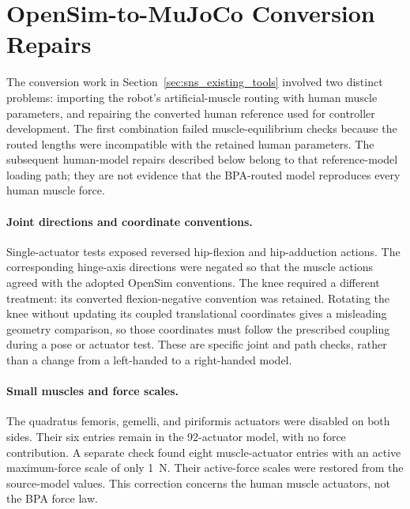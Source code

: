 \section{OpenSim-to-MuJoCo Conversion Repairs}\label{sec:app_conversion_repairs}

The conversion work in Section~\ref{sec:sns_existing_tools} involved two distinct problems: importing the robot's artificial-muscle routing with human muscle parameters, and repairing the converted human reference used for controller development. The first combination failed muscle-equilibrium checks because the routed lengths were incompatible with the retained human parameters. The subsequent human-model repairs described below belong to that reference-model loading path; they are not evidence that the BPA-routed model reproduces every human muscle force.

\paragraph{Joint directions and coordinate conventions.}
Single-actuator tests exposed reversed hip-flexion and hip-adduction actions. The corresponding hinge-axis directions were negated so that the muscle actions agreed with the adopted OpenSim conventions. The knee required a different treatment: its converted flexion-negative convention was retained. Rotating the knee without updating its coupled translational coordinates gives a misleading geometry comparison, so those coordinates must follow the prescribed coupling during a pose or actuator test. These are specific joint and path checks, rather than a change from a left-handed to a right-handed model.

\paragraph{Small muscles and force scales.}
The quadratus femoris, gemelli, and piriformis actuators were disabled on both sides. Their six entries remain in the 92-actuator model, with no force contribution. A separate check found eight muscle-actuator entries with an active maximum-force scale of only \qty{1}{\newton}. Their active-force scales were restored from the source-model values. This correction concerns the human muscle actuators, not the BPA force law.

